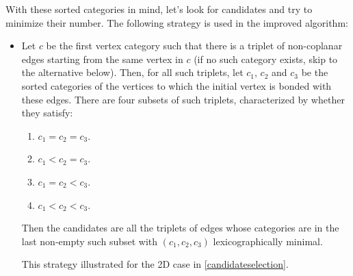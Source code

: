 \documentclass[main.tex]{subfiles}
\begin{document}
With these sorted categories in mind, let's look for candidates and try to minimize their number. The following strategy is used in the improved algorithm:
\begin{itemize}[noitemsep]
	\item Let $c$ be the first vertex category such that there is a triplet of non-coplanar edges starting from the same vertex in $c$ (if no such category exists, skip to the alternative below). Then, for all such triplets, let $c_1$, $c_2$ and $c_3$ be the sorted categories of the vertices to which the initial vertex is bonded with these edges. There are four subsets of such triplets, characterized by whether they satisfy:
	\begin{enumerate}[noitemsep]
		\item $c_1 = c_2 = c_3$.
		\item $c_1 < c_2 = c_3$.
		\item $c_1 = c_2 < c_3$.
		\item $c_1 < c_2 < c_3$.
	\end{enumerate}
	Then the candidates are all the triplets of edges whose categories are in the last non-empty such subset with $(c_1,c_2,c_3)$ lexicographically minimal.
	
	This strategy illustrated for the 2D case in \cref{candidateselection}.
	

\end{itemize}
\end{document}
